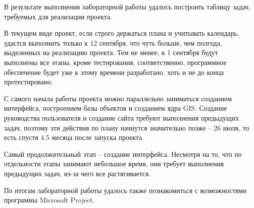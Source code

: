 \newpage
{}
В результате выполнения лабораторной работы удалось построить таблицу задач, требуемых для реализации проекта.

В текущем виде проект, если строго держаться плана и учитывать календарь, удастся выполнить только к 12 сентября, что чуть больше, чем полгода, выделенных на реализацию проекта. 
Тем не менее, к 1 сентября будут выполнены все этапы, кроме тестирования, соответственно, программное обеспечение будет уже к этому времени разработано, хоть и не до конца протестировано.

С самого начала работы проекта можно параллельно заниматься созданием интерфейса, построением базы объектов и созданием ядра GIS.
Создание руководства пользователя и создание сайта требуют выполнения предыдущих задач, поэтому эти действия по плану начнутся значительно позже -- 26 июля, то есть спустя 4.5 месяца после запуска проекта.

Самый продолжительный этап -- создание интерфейса. Несмотря на то, что по отдельности этапы занимают небольшое время, они требует выполнения предыдущих задач, из-за чего все растягивается.

По итогам лабораторной работы удалось также познакомиться с возможностями программы Microsoft Project.
